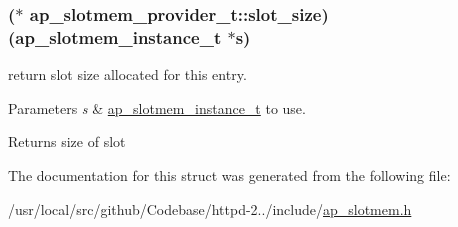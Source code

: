 \subsubsection[{\texorpdfstring{slot\+\_\+size}{slot_size}}]{($\ast$  ap\+\_\+slotmem\+\_\+provider\+\_\+t\+::slot\+\_\+size) ({\bf ap\+\_\+slotmem\+\_\+instance\+\_\+t} $\ast${\bf s})}\hypertarget{structap__slotmem__provider__t_a988778ba739892325a15b01371be995b}{}\label{structap__slotmem__provider__t_a988778ba739892325a15b01371be995b}
return slot size allocated for this entry. 
\begin{DoxyParams}{Parameters}
{\em s} & \hyperlink{structap__slotmem__instance__t}{ap\+\_\+slotmem\+\_\+instance\+\_\+t} to use. \\
\hline
\end{DoxyParams}
\begin{DoxyReturn}{Returns}
size of slot 
\end{DoxyReturn}


The documentation for this struct was generated from the following file\+:\begin{DoxyCompactItemize}
\item 
/usr/local/src/github/\+Codebase/httpd-\/2../include/\hyperlink{ap__slotmem_8h}{ap\+\_\+slotmem.\+h}\end{DoxyCompactItemize}
